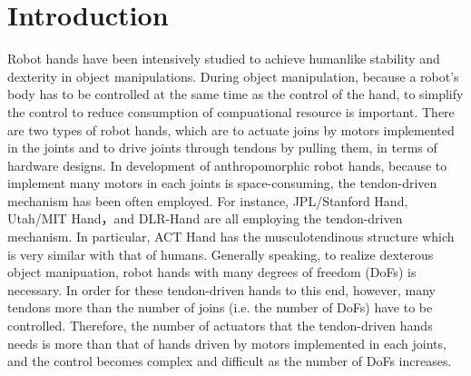 \documentclass{llncs}
\begin{document}
\section{Introduction} %
\label{sec:introduction}
Robot hands have been intensively studied to achieve humanlike stability
and dexterity in object manipulations.
During object manipulation, because a robot's body has to be controlled
at the same time as the control of the hand, to simplify the control to
reduce consumption of compuational resource is important.
There are two types of robot hands, which are to actuate joins by
motors implemented in the joints and to drive joints through tendons by
pulling them, in terms of hardware designs.
In development of anthropomorphic robot hands, because to implement many
motors in each joints is space-consuming, the tendon-driven mechanism
has been often employed.
For instance, JPL/Stanford Hand\cite{salisbury1982}, Utah/MIT
Hand\cite{Jacobsen1986}，and DLR-Hand\cite{Butterfass2001} are all
employing the tendon-driven mechanism.
In particular, ACT Hand\cite{vande2004} has the musculotendinous
structure which is very similar with that of humans.
Generally speaking, to realize dexterous object manipuation, robot hands
with many degrees of freedom (DoFs) is necessary.
In order for these tendon-driven hands to this end, however, many
tendons more than the number of joins (i.e. the number of DoFs) have to
be controlled.
Therefore, the number of actuators that the tendon-driven hands needs is
more than that of hands driven by motors implemented in each joints, and
the control becomes complex and difficult as the number of DoFs increases.
\end{document}
